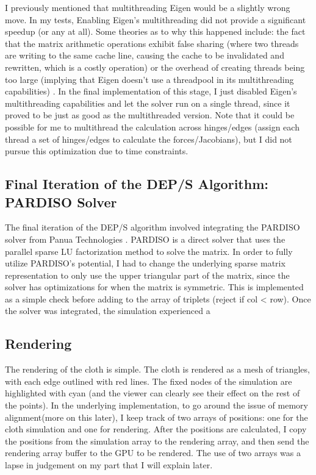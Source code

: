 \documentclass[letterpaper, 10 pt, conference]{ieeeconf}  %
\begin{document}
I previously mentioned that multithreading Eigen would be a slightly wrong move. In my tests, Enabling Eigen's multithreading did not provide a significant speedup (or any at all). Some theories as to why this happened include: the fact that the matrix arithmetic operations exhibit false sharing (where two threads are writing to the same cache line, causing the cache to be invalidated and rewritten, which is a costly operation) or the overhead of creating threads being too large (implying that Eigen doesn't use a threadpool in its multithreading capabilities) \cite{kernel_false_sharing}. In the final implementation of this stage, I just disabled Eigen's multithreading capabilities and let the solver run on a single thread, since it proved to be just as good as the multithreaded version. Note that it could be possible for me to multithread the calculation across hinges/edges (assign each thread a set of hinges/edges to calculate the forces/Jacobians), but I did not pursue this optimization due to time constraints.

\subsection{Final Iteration of the DEP/S Algorithm: PARDISO Solver}
The final iteration of the DEP/S algorithm involved integrating the PARDISO solver from Panua Technologies \cite{Pasadakis2023} \cite{EFTEKHARI2021101389} \cite{gaedkemerzhäuser2022}. PARDISO is a direct solver that uses the parallel sparse LU factorization method to solve the matrix. In order to fully utilize PARDISO's potential, I had to change the underlying sparse matrix representation to only use the upper triangular part of the matrix, since the solver has optimizations for when the matrix is symmetric. This is implemented as a simple check before adding to the array of triplets (reject if col < row). Once the solver was integrated, the simulation experienced a 

\subsection{Rendering}
The rendering of the cloth is simple. The cloth is rendered as a mesh of triangles, with each edge outlined with red lines. The fixed nodes of the simulation are highlighted with cyan (and the viewer can clearly see their effect on the rest of the points). In the underlying implementation, to go around the issue of memory alignment(more on this later), I keep track of two arrays of positions: one for the cloth simulation and one for rendering. After the positions are calculated, I copy the positions from the simulation array to the rendering array, and then send the rendering array buffer to the GPU to be rendered. The use of two arrays was a lapse in judgement on my part that I will explain later. 
\end{document}
